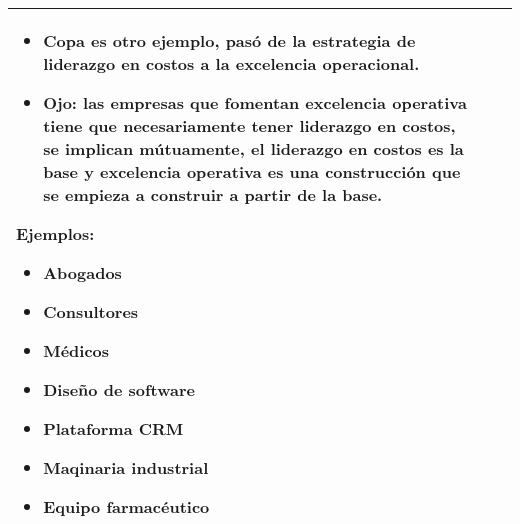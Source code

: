 \begin{itemize}
\begin{center}
\begin{supertabular}{ | p{6cm} | p{6cm} | p{6cm} |}
\begin{itemize}
\begin{itemize}
                                \item Copa es otro ejemplo, pasó de la estrategia de liderazgo en costos a la excelencia operacional.
                                \item Ojo: las empresas que fomentan excelencia operativa tiene que necesariamente tener liderazgo en costos, se implican mútuamente, el liderazgo en costos es la base y excelencia operativa es una construcción que se empieza a construir a partir de la base.
                            \end{itemize}
                    \end{itemize}
                    Ejemplos:  
                        \begin{itemize}
                            \item Abogados 
                            \item Consultores 
                            \item Médicos 
                            \item Diseño de software 
                            \item Plataforma CRM 
                            \item Maqinaria industrial
                            \item Equipo farmacéutico 
                        \end{itemize}
                    \\
               \hline
           \end{supertabular}
        \end{center}
\end{itemize}

\begin{center}
\end{center}

